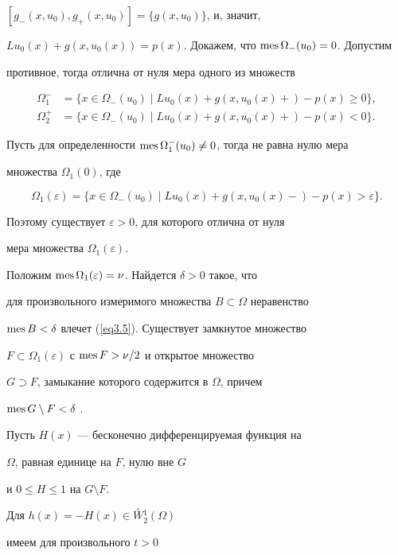 $[g_{-}(x,u_0),g_{+}(x,u_0)]=\{g(x,u_0)\}$, и, значит,


$Lu_0(x)+g(x,u_0(x))=p(x)$. Докажем, что $\operatorname{mes}\Omega_{-}(u_0)=0$. Допустим


противное, тогда отлична от нуля мера одного из множеств


\begin{align*}


\Omega_{1}^{-}&=\{x\in\Omega_{-}(u_0)\mid Lu_0(x)+g(x,u_0(x)+)-p(x)\ge 0\},\\


\Omega_{2}^{+}&=\{x\in\Omega_{-}(u_0)\mid Lu_0(x)+g(x,u_0(x)+)-p(x) < 0\}.


\end{align*}





Пусть для определенности $\operatorname{mes}\Omega_1^-(u_0)\ne 0$, тогда не равна нулю мера


множества $\Omega_1(0)$, где


$$


\Omega_1(\varepsilon)=\{x \in \Omega_{-}(u_0) \mid


Lu_0(x)+g(x,u_0(x)-)-p(x)>\varepsilon\}.


$$


Поэтому существует $\varepsilon>0$, для которого отлична от нуля


мера множества $\Omega_1(\varepsilon)$.





Положим $\operatorname{mes}\Omega_1(\varepsilon)=\nu$. Найдется $\delta>0$ такое, что


для произвольного измеримого множества $B\subset\Omega$ неравенство


$\operatorname{mes} B<\delta$ влечет (\ref{eq3.5}). Существует замкнутое множество


$F\subset\Omega_1(\varepsilon)$ с $\operatorname{mes} F>\nu/2$ и открытое множество


$G \supset F$, замыкание которого содержится в $\Omega$, причем


$\operatorname{mes} G \setminus F<\delta$ \cite{n14}.


Пусть $H(x)$ --- бесконечно дифференцируемая функция на


$\Omega$, равная единице на $F$, нулю вне $G$


и $0 \le H \le 1$ на $G \setminus F$.


Для $h(x)=-H(x)\in \overset{\circ}{W}{}^1_2(\Omega)$


имеем для произвольного $t>0$


